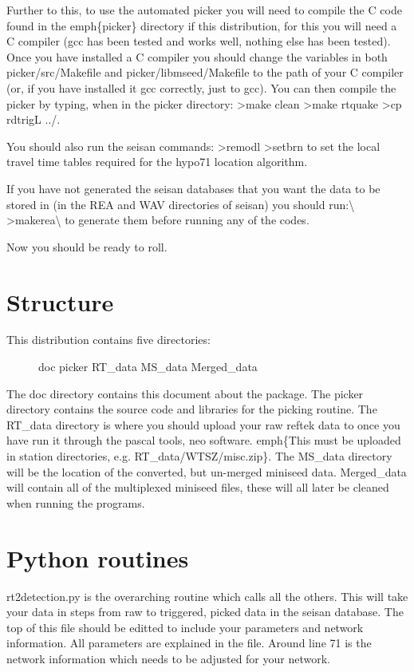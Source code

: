 \documentclass[letterpaper,10pt,english]{sphinxmanual}
\begin{document}
Further to this, to use the automated picker you will need to compile the C code found
in the emph\{picker\} directory if this distribution, for this you will need a C compiler
(gcc has been tested and works well, nothing else has been tested).  Once you have
installed a C compiler you should change the variables in both picker/src/Makefile and
picker/libmseed/Makefile to the path of your C compiler (or, if you have installed it gcc
correctly, just to gcc).  You can then compile the picker by typing, when in the picker
directory:
\textgreater{}make clean
\textgreater{}make rtquake
\textgreater{}cp rdtrigL ../.

You should also run the seisan commands:
\textgreater{}remodl
\textgreater{}setbrn
to set the local travel time tables required for the hypo71 location algorithm.

If you have not generated the seisan databases that you want the data to be stored in
(in the REA and WAV directories of seisan) you should run:\textbackslash{}
\textgreater{}makerea\textbackslash{}
to generate them before running any of the codes.

Now you should be ready to roll.


\section{Structure}
\label{intro:structure}\begin{description}
\item[{This distribution contains five directories:}] \leavevmode
doc
picker
RT\_data
MS\_data
Merged\_data

\end{description}

The doc directory contains this document about the package.  The picker directory contains
the source code and libraries for the picking routine.  The RT\_data directory is where
you should upload your raw reftek data to once you have run it through the pascal tools,
neo software. emph\{This must be uploaded in station directories, e.g. RT\_data/WTSZ/misc.zip\}.
The MS\_data directory will be the location of the converted, but un-merged
miniseed data.  Merged\_data will contain all of the multiplexed miniseed files, these will
all later be cleaned when running the programs.


\section{Python routines}
\label{intro:python-routines}
rt2detection.py is the overarching routine which calls all the others.  This will
take your data in steps from raw to triggered, picked data in the seisan database.
The top of this file should be editted to include your parameters and network
information.  All parameters are explained in the file. Around line 71 is the network
information which needs to be adjusted for your network.
\end{document}
